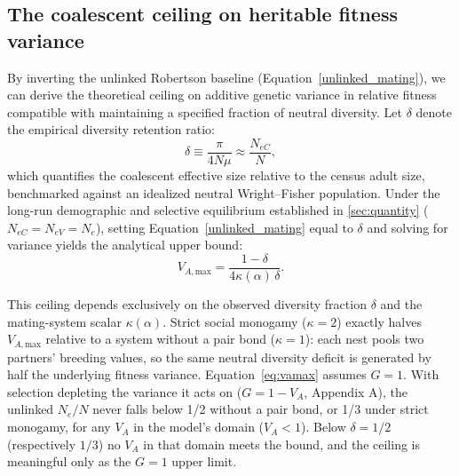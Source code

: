 \documentclass[12pt]{article}
\begin{document}
\subsection{The coalescent ceiling on heritable fitness variance}\label{sec:ceiling}
By inverting the unlinked Robertson baseline (Equation~\eqref{unlinked_mating}), we can derive the theoretical ceiling on additive genetic variance in relative fitness compatible with maintaining a specified fraction of neutral diversity. Let $\delta$ denote the empirical diversity retention ratio:
\begin{equation}
    \delta \equiv \frac{\pi}{4N\mu} \approx \frac{N_{eC}}{N},
\end{equation}
which quantifies the coalescent effective size relative to the census adult size, benchmarked against an idealized neutral Wright--Fisher population. Under the long-run demographic and selective equilibrium established in \autoref{sec:quantity} ($N_{eC} = N_{eV} = N_e$), setting Equation~\eqref{unlinked_mating} equal to $\delta$ and solving for variance yields the analytical upper bound:
\begin{equation}
    V_{A,\text{max}} = \frac{1 - \delta}{4\kappa(\alpha)\,\delta}. \label{eq:vamax}
\end{equation}

This ceiling depends exclusively on the observed diversity fraction $\delta$ and the mating-system scalar $\kappa(\alpha)$. Strict social monogamy ($\kappa = 2$) exactly halves $V_{A,\text{max}}$ relative to a system without a pair bond ($\kappa = 1$): each nest pools two partners' breeding values, so the same neutral diversity deficit is generated by half the underlying fitness variance. Equation~\eqref{eq:vamax} assumes $G = 1$. With selection depleting the variance it acts on ($G = 1 - V_A$, Appendix A), the unlinked $N_e/N$ never falls below 1/2 without a pair bond, or 1/3 under strict monogamy, for any $V_A$ in the model's domain ($V_A < 1$). Below $\delta = 1/2$ (respectively $1/3$) no $V_A$ in that domain meets the bound, and the ceiling is meaningful only as the $G = 1$ upper limit.
\end{document}
